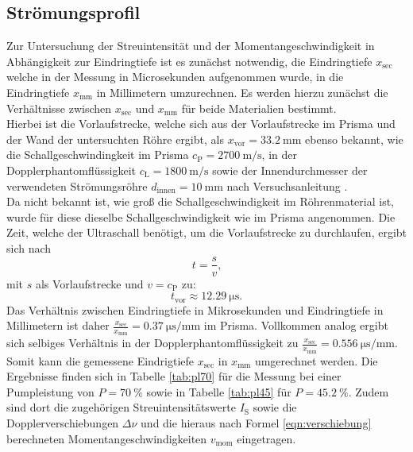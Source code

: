\FloatBarrier

\subsection{Strömungsprofil}
Zur Untersuchung der Streuintensität und der Momentangeschwindigkeit in Abhängigkeit zur Eindringtiefe ist es zunächst notwendig, die Eindringtiefe $x_{\mathrm{sec}}$ welche in der Messung in Microsekunden aufgenommen wurde, in die Eindringtiefe $x_{\mathrm{mm}}$ in Millimetern umzurechnen.
Es werden hierzu zunächst die Verhältnisse zwischen $x_{\mathrm{sec}}$ und $x_{\mathrm{mm}}$ für beide Materialien bestimmt.\\
Hierbei ist die Vorlaufstrecke, welche sich aus der Vorlaufstrecke im Prisma und der Wand der untersuchten Röhre ergibt, als $x_\mathrm{vor}=\SI{33.2}{\milli\meter}$ ebenso bekannt, wie die Schallgeschwindingkeit im Prisma $c_\mathrm{P}=\SI{2700}{\meter\per\second}$, in der Dopplerphantomflüssigkeit $c_\mathrm{L}=\SI{1800}{\meter\per\second}$ sowie der Innendurchmesser der verwendeten Strömungsröhre $d_\mathrm{innen}=\SI{10}{\milli\meter}$ nach Versuchsanleitung \cite{Anleitung}.\\
Da nicht bekannt ist, wie groß die Schallgeschwindigkeit im Röhrenmaterial ist, wurde für diese dieselbe Schallgeschwindigkeit wie im Prisma angenommen.
Die Zeit, welche der Ultraschall benötigt, um die Vorlaufstrecke zu durchlaufen, ergibt sich nach
\begin{equation*}
  t=\frac{s}{v} \text{,}
\end{equation*}
mit $s$ als Vorlaufstrecke und $v=c_\mathrm{P}$ zu:
\begin{equation*}
    t_\mathrm{vor}\approx\SI{12.29}{\micro\second}\text{.}
\end{equation*}
Das Verhältnis zwischen Eindringtiefe in Mikrosekunden und Eindringtiefe in Millimetern ist daher $\frac{x_\mathrm{sec}}{x_\mathrm{mm}}=\SI{0.37}{\micro\second\per\milli\meter}$ im Prisma. Vollkommen analog ergibt sich selbiges Verhältnis in der Dopplerphantomflüssigkeit zu $\frac{x_\mathrm{sec}}{x_\mathrm{mm}}=\SI{0.556}{\micro\second\per\milli\meter}$.
\\Somit kann die gemessene Eindrigtiefe $x_\mathrm{sec}$ in $x_\mathrm{mm}$ umgerechnet werden. Die Ergebnisse finden sich in Tabelle \ref{tab:pl70} für die Messung bei einer Pumpleistung von $P=\SI{70}{\percent}$ sowie in Tabelle  \ref{tab:pl45} für $P=\SI{45.2}{\percent}$.
Zudem sind dort die zugehörigen Streuintensitätswerte $I_\mathrm{S}$ sowie die Dopplerverschiebungen $\Delta \nu$ und die hieraus nach Formel \eqref{eqn:verschiebung} berechneten Momentangeschwindigkeiten $v_\mathrm{mom}$ eingetragen.

